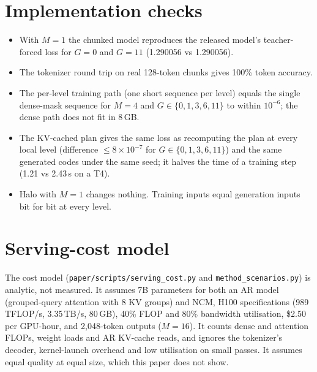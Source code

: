 
\section{Implementation checks}
\label{sec:checks}

\begin{itemize}
  \item With $M{=}1$ the chunked model reproduces the released model's teacher-forced loss for $G{=}0$ and $G{=}11$
        (1.290056 vs 1.290056).
  \item The tokenizer round trip on real 128-token chunks gives 100\% token accuracy.
  \item The per-level training path (one short sequence per level) equals the single dense-mask sequence for
        $M{=}4$ and $G\in\{0,1,3,6,11\}$ to within $10^{-6}$; the dense path does not fit in 8\,GB.
  \item The KV-cached plan gives the same loss as recomputing the plan at every local level (difference
        $\le 8{\times}10^{-7}$ for $G\in\{0,1,3,6,11\}$) and the same generated codes under the same seed; it halves
        the time of a training step (1.21 vs 2.43\,s on a T4).
  \item Halo with $M{=}1$ changes nothing. Training inputs equal generation inputs bit for bit at every level.
\end{itemize}

\section{Serving-cost model}
\label{sec:cost}

The cost model (\texttt{paper/scripts/serving\_cost.py} and \texttt{method\_scenarios.py}) is analytic, not measured.
It assumes 7B parameters for both an AR model (grouped-query attention with 8 KV groups) and NCM, H100 specifications
(989 TFLOP/s, 3.35\,TB/s, 80\,GB), 40\% FLOP and 80\% bandwidth utilisation, \$2.50 per GPU-hour, and 2,048-token
outputs ($M{=}16$). It counts dense and attention FLOPs, weight loads and AR KV-cache reads, and ignores the tokenizer's
decoder, kernel-launch overhead and low utilisation on small passes. It assumes equal quality at equal size, which
this paper does not show.

